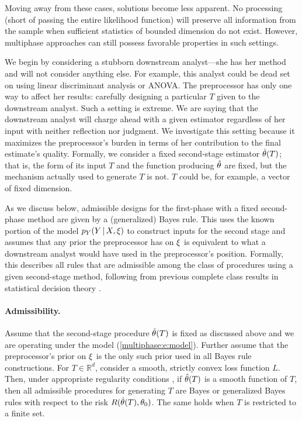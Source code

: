 Moving away from these cases, solutions become less apparent.
No processing (short of passing the entire likelihood function) will preserve all information from the sample when sufficient statistics of bounded dimension do not exist.
However, multiphase approaches can still possess favorable properties in such settings.

We begin by considering a stubborn downstream analyst---she has her method and will not consider anything else.
For example, this analyst could be dead set on using linear discriminant analysis or ANOVA.
The preprocessor has only one way to affect her results: carefully designing a particular $T$ given to the downstream analyst.
Such a setting is extreme.
We are saying that the downstream analyst will charge ahead with a given estimator regardless of her input with neither reflection nor judgment.
We investigate this setting because it maximizes the preprocessor's burden in terms of her contribution to the final estimate's quality.
Formally, we consider a fixed second-stage estimator $\hat{\theta}(T)$; that is, the form of its input $T$ and the function producing $\hat{\theta}$ are fixed, but the mechanism actually used to generate $T$ is not.
$T$ could be, for example, a vector of fixed dimension.

As we discuss below, admissible designs for the first-phase with a fixed second-phase method are given by a (generalized) Bayes rule.
This uses the known portion of the model $p_Y(Y \, | \, X, \xi)$ to construct inputs for the second stage and assumes that any prior the preprocessor has on $\xi$ is equivalent to what a downstream analyst  would have used in the preprocessor's position.
Formally, this describes all rules that are admissible among the class of procedures using a given second-stage method, following from previous complete class results in statistical decision theory \citep[e.g.,][]{Berger1985,Farrell1968}.

\paragraph{Admissibility.}
Assume that the second-stage procedure $\hat{\theta}(T)$ is fixed as discussed above and we are operating under the model (\ref{multiphase:e:model}).
Further assume that the preprocessor's prior on $\xi$ is the only such prior used in all Bayes rule constructions.
For $T \in \mathbb{R}^d$, consider a smooth, strictly convex loss function $L$.
Then, under appropriate regularity conditions \citep[e.g.,][]{Berger1985,Farrell1968}, if $\hat{\theta}(T)$ is a smooth function of $T$, then all admissible procedures for generating $T$ are Bayes or generalized Bayes rules with respect to the risk $R(\hat{\theta}(T), \theta_0)$.
The same holds when $T$ is restricted to a finite set.\\

